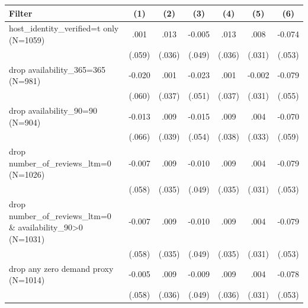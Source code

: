 \begin{tabular}{lcccccc}
\hline
Filter & (1) & (2) & (3) & (4) & (5) & (6) \\
\hline
host\_identity\_verified=t only (N=1059) & .001 & .013 & -0.005 & .013 & .008 & -0.074 \\
 & (.059) & (.036) & (.049) & (.036) & (.031) & (.053) \\
drop availability\_365=365 (N=981) & -0.020 & .001 & -0.023 & .001 & -0.002 & -0.079 \\
 & (.060) & (.037) & (.051) & (.037) & (.031) & (.055) \\
drop availability\_90=90 (N=904) & -0.013 & .009 & -0.015 & .009 & .004 & -0.070 \\
 & (.066) & (.039) & (.054) & (.038) & (.033) & (.059) \\
drop number\_of\_reviews\_ltm=0 (N=1026) & -0.007 & .009 & -0.010 & .009 & .004 & -0.079 \\
 & (.058) & (.035) & (.049) & (.035) & (.031) & (.053) \\
drop number\_of\_reviews\_ltm=0 \& availability\_90>0 (N=1031) & -0.007 & .009 & -0.010 & .009 & .004 & -0.079 \\
 & (.058) & (.035) & (.049) & (.035) & (.031) & (.053) \\
drop any zero demand proxy (N=1014) & -0.005 & .009 & -0.009 & .009 & .004 & -0.078 \\
 & (.058) & (.036) & (.049) & (.036) & (.031) & (.053) \\
\hline
\end{tabular}
